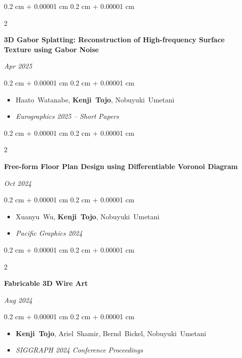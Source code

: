 \documentclass[10pt, letterpaper]{article}
\newenvironment{highlights}{
    \begin{itemize}[
        topsep=0.10 cm,
        parsep=0.10 cm,
        partopsep=0pt,
        itemsep=0pt,
        leftmargin=0.4 cm + 10pt
    ]
}{
    \end{itemize}
} %
\newenvironment{onecolentry}{
    \begin{adjustwidth}{
        0.2 cm + 0.00001 cm
    }{
        0.2 cm + 0.00001 cm
    }
}{
    \end{adjustwidth}
} %
\newenvironment{shorttwocolentry}[2][]{
    \onecolentry
    \def\secondColumn{#2}
    \setcolumnwidth{\fill, 2.5 cm}
    \begin{paracol}{2}
}{
    \switchcolumn \raggedleft \secondColumn
    \end{paracol}
    \endonecolentry
} %
\begin{document}
        \vspace{0.20 cm}
        \begin{samepage}
            \begin{shorttwocolentry}{\textit{Apr 2025}}
                \textbf{3D Gabor Splatting: Reconstruction of High-frequency Surface Texture using Gabor Noise}
            \end{shorttwocolentry}
            \vspace{0.10 cm}
            \begin{onecolentry}
                \begin{highlights}
                    \item \mbox{Haato Watanabe}, \mbox{\textbf{Kenji Tojo}}, \mbox{Nobuyuki Umetani}
                    \item \textit{Eurographics 2025 -- Short Papers}
                \end{highlights}
            \end{onecolentry}
        \end{samepage}

        \vspace{0.20 cm}
        \begin{samepage}
            \begin{shorttwocolentry}{\textit{Oct 2024}}
                \textbf{Free-form Floor Plan Design using Differentiable Voronoi Diagram}
            \end{shorttwocolentry}
            \vspace{0.10 cm}
            \begin{onecolentry}
                \begin{highlights}
                    \item \mbox{Xuanyu Wu}, \mbox{\textbf{Kenji Tojo}}, \mbox{Nobuyuki Umetani}
                    \item \textit{Pacific Graphics 2024}
                \end{highlights}
            \end{onecolentry}
        \end{samepage}

        \vspace{0.20 cm}
        \begin{samepage}
            \begin{shorttwocolentry}{\textit{Aug 2024}}
                \textbf{Fabricable 3D Wire Art}
            \end{shorttwocolentry}
            \vspace{0.10 cm}
            \begin{onecolentry}
                \begin{highlights}
                    \item \mbox{\textbf{Kenji Tojo}}, \mbox{Ariel Shamir}, \mbox{Bernd Bickel}, \mbox{Nobuyuki Umetani}
                    \item \textit{SIGGRAPH 2024 Conference Proceedings}
                \end{highlights}
            \end{onecolentry}
        \end{samepage}
\end{document}
